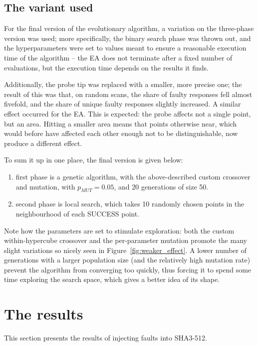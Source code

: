 \documentclass[times, utf8, diplomski]{fer}
\begin{document}
\subsection{The variant used}
For the final version of the evolutionary algorithm, a variation on the
three-phase version was used; more specifically, the binary search phase
was thrown out, and the hyperparameters were set to values meant to ensure
a reasonable execution time of the algorithm -- the EA does not terminate
after a fixed number of evaluations, but the execution time depends on the
results it finds.

Additionally, the probe tip was replaced with a smaller, more precise one;
the result of this was that, on random scans, the share of faulty responses
fell almost fivefold, and the share of unique faulty responses slightly increased.
A similar effect occurred for the EA. This is expected: the probe affects not
a single point, but an area. Hitting a smaller area means that points otherwise
near, which would before have affected each other enough not to be distinguishable,
now produce a different effect.

To sum it up in one place, the final version is given below:
\begin{enumerate}
    \item first phase is a genetic algorithm, with the above-described custom crossover
          and mutation, with $p_{MUT} = 0.05$, and 20 generations of size 50.
    \item second phase is local search, which takes 10 randomly chosen points in
          the neighbourhood of each SUCCESS point.
\end{enumerate}

Note how the parameters are set to stimulate exploration: both the custom
within-hypercube crossover and the per-parameter mutation promote the many
slight variations so nicely seen in Figure~\ref{fig:weaker_effect}. A lower
number of generations with a larger population size (and the relatively high
mutation rate) prevent the algorithm from converging too quickly, thus forcing
it to spend some time exploring the search space, which gives a better idea
of its shape.



\section{The results}\label{sec:results}
This section presents the results of injecting faults into SHA3-512.
\end{document}
